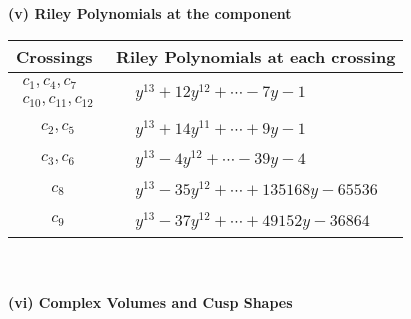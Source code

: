 \documentclass[1p]{elsarticle_modified}
\theoremstyle{definition}
\begin{document}
\flushleft \textbf{(v) Riley Polynomials at the component}\newline \\
\begin{tabular}{m{50pt}|m{274pt}}
Crossings & \hspace{64pt}Riley Polynomials at each crossing \\
\hline $$\begin{aligned}c_{1},c_{4},c_{7}\\c_{10},c_{11},c_{12}\end{aligned}$$&$\begin{aligned}
&y^{13}+12 y^{12}+\cdots-7 y-1
\end{aligned}$\\
\hline $$\begin{aligned}c_{2},c_{5}\end{aligned}$$&$\begin{aligned}
&y^{13}+14 y^{11}+\cdots+9 y-1
\end{aligned}$\\
\hline $$\begin{aligned}c_{3},c_{6}\end{aligned}$$&$\begin{aligned}
&y^{13}-4 y^{12}+\cdots-39 y-4
\end{aligned}$\\
\hline $$\begin{aligned}c_{8}\end{aligned}$$&$\begin{aligned}
&y^{13}-35 y^{12}+\cdots+135168 y-65536
\end{aligned}$\\
\hline $$\begin{aligned}c_{9}\end{aligned}$$&$\begin{aligned}
&y^{13}-37 y^{12}+\cdots+49152 y-36864
\end{aligned}$\\
\hline
\end{tabular}\\~\\
\newpage\flushleft \textbf{(vi) Complex Volumes and Cusp Shapes}
\end{document}
